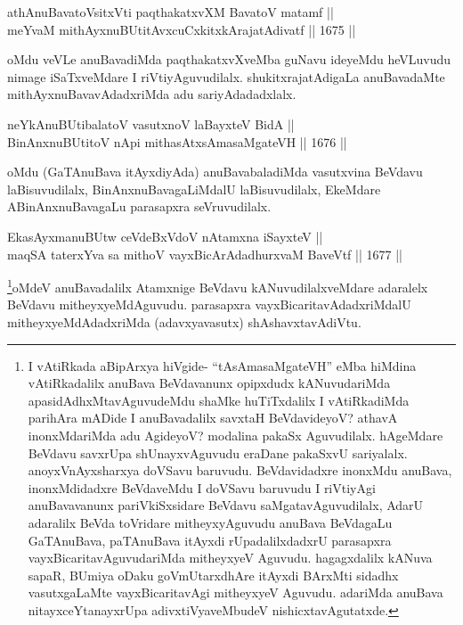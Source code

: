 
\begin{shl}
athAnuBavatoV\s sitxVti paqthakatxvXM BavatoV matamf || \\
meYvaM mithAyxnuBUtitAvxcuCxkitxkArajatAdivatf \hfill || 1675 ||  
\end{shl}

\begin{artha}
oMdu veVLe anuBavadiMda paqthakatxvXveMba guNavu ideyeMdu heVLuvudu nimage iSaTxveMdare I riVtiyAguvudilalx. shukitxrajatAdigaLa anuBavadaMte mithAyxnuBavavAdadxriMda adu sariyAdadadxlalx.
\end{artha}

\begin{shl}
neYkAnuBUtibalatoV vasutxnoV laBayxteV BidA || \\
BinAnxnuBUtitoV nApi mithasAtxsAmasaMgateVH \hfill || 1676 ||  
\end{shl}

\begin{artha}
oMdu (GaTAnuBava itAyxdiyAda) anuBavabaladiMda vasutxvina BeVdavu laBisuvudilalx, BinAnxnuBavagaLiMdalU laBisuvudilalx, EkeMdare ABinAnxnuBavagaLu parasapxra seVruvudilalx.
\end{artha}

\begin{shl}
EkasAyxmanuBUtw ceVdeBxVdoV nA\s \s tamxna iSayxteV || \\
maqSA taterxYva sa mithoV vayxBicArAdadhurxvaM BaveVtf \hfill || 1677 ||  
\end{shl}

\begin{artha}
\footnote{I vAtiRkada aBipArxya hiVgide- ``tAsAmasaMgateVH'' eMba hiMdina vAtiRkadalilx anuBava BeVdavanunx opipxdudx kANuvudariMda apasidAdhxMtavAguvudeMdu shaMke huTiTxdalilx I vAtiRkadiMda parihAra mADide I anuBavadalilx savxtaH BeVdavideyoV? athavA inonxMdariMda adu AgideyoV? modalina pakaSx Aguvudilalx. hAgeMdare BeVdavu savxrUpa shUnayxvAguvudu eraDane pakaSxvU sariyalalx. anoyxVnAyxsharxya doVSavu baruvudu. BeVdavidadxre inonxMdu anuBava, inonxMdidadxre BeVdaveMdu I doVSavu baruvudu I riVtiyAgi anuBavavanunx pariVkiSxsidare BeVdavu saMgatavAguvudilalx, AdarU adaralilx BeVda toVridare mitheyxyAguvudu anuBava BeVdagaLu GaTAnuBava, paTAnuBava itAyxdi rUpadalilxdadxrU parasapxra vayxBicaritavAguvudariMda mitheyxyeV Aguvudu. hagagxdalilx kANuva sapaR, BUmiya oDaku goVmUtarxdhAre itAyxdi BArxMti sidadhx vasutxgaLaMte vayxBicaritavAgi mitheyxyeV Aguvudu. adariMda anuBava nitayxceYtanayxrUpa adivxtiVyaveMbudeV nishicxtavAgutatxde.}oMdeV anuBavadalilx Atamxnige BeVdavu kANuvudilalxveMdare adaralelx BeVdavu mitheyxyeMdAguvudu. parasapxra vayxBicaritavAdadxriMdalU mitheyxyeMdAdadxriMda (adavxyavasutx) shAshavxtavAdiVtu.
\end{artha}

